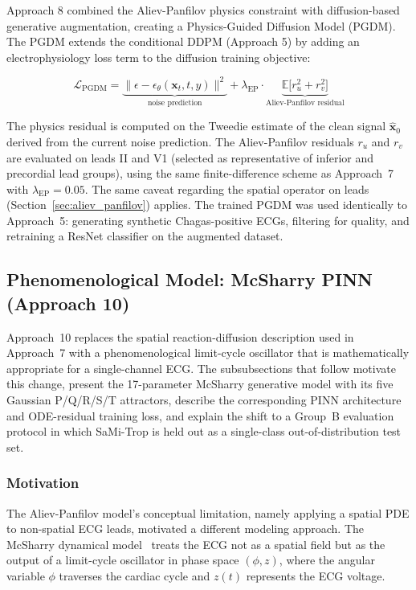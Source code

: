 Approach 8 combined the Aliev-Panfilov physics constraint with diffusion-based generative augmentation, creating a Physics-Guided Diffusion Model (PGDM). The PGDM extends the conditional DDPM (Approach 5) by adding an electrophysiology loss term to the diffusion training objective:

\begin{equation}
    \mathcal{L}_{\text{PGDM}} = \underbrace{\| \epsilon - \epsilon_\theta(\mathbf{x}_t, t, y) \|^2}_{\text{noise prediction}} + \lambda_{\text{EP}} \cdot \underbrace{\mathbb{E}\bigl[r_u^2 + r_v^2\bigr]}_{\text{Aliev-Panfilov residual}}
\end{equation}

The physics residual is computed on the Tweedie estimate of the clean signal $\hat{\mathbf{x}}_0$ derived from the current noise prediction. The Aliev-Panfilov residuals $r_u$ and $r_v$ are evaluated on leads II and V1 (selected as representative of inferior and precordial lead groups), using the same finite-difference scheme as Approach~7 with $\lambda_{\text{EP}} = 0.05$. The same caveat regarding the spatial operator on leads (Section~\ref{sec:aliev_panfilov}) applies. The trained PGDM was used identically to Approach~5: generating synthetic Chagas-positive ECGs, filtering for quality, and retraining a ResNet classifier on the augmented dataset.

\subsection{Phenomenological Model: McSharry PINN (Approach 10)}
\label{sec:mcsharry}

Approach~10 replaces the spatial reaction-diffusion description used in Approach~7 with a phenomenological limit-cycle oscillator that is mathematically appropriate for a single-channel ECG. The subsubsections that follow motivate this change, present the 17-parameter McSharry generative model with its five Gaussian P/Q/R/S/T attractors, describe the corresponding PINN architecture and ODE-residual training loss, and explain the shift to a Group~B evaluation protocol in which SaMi-Trop is held out as a single-class out-of-distribution test set.

\subsubsection{Motivation}

The Aliev-Panfilov model's conceptual limitation, namely applying a spatial PDE to non-spatial ECG leads, motivated a different modeling approach. The McSharry dynamical model~\cite{mcsharry2003dynamical} treats the ECG not as a spatial field but as the output of a limit-cycle oscillator in phase space $(\phi, z)$, where the angular variable $\phi$ traverses the cardiac cycle and $z(t)$ represents the ECG voltage.

